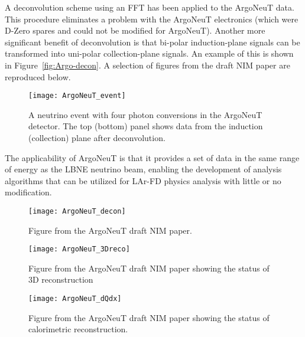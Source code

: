 A deconvolution scheme using an FFT has been applied to the ArgoNeuT data. This procedure eliminates a problem with the ArgoNeuT electronics (which were D-Zero spares and could not be modified for ArgoNeuT). Another more significant benefit of deconvolution is that bi-polar induction-plane signals can be transformed into uni-polar collection-plane signals. An example of this is shown in Figure~\ref{fig:Argo-decon}. A selection of figures from the draft NIM paper are reproduced below.


\begin{figure}
\centering 
{\texttt{[image: ArgoNeuT\_event]}}
\caption[ArgoNeuT neutrino event with four photon conversions]{A neutrino event with four photon conversions in the ArgoNeuT detector. The top (bottom) panel shows data from the induction (collection) plane after deconvolution. }
\label{2pi0}
\end{figure}


The applicability of ArgoNeuT is that it provides a set of data in the same range of energy as the LBNE neutrino beam, enabling the development of analysis algorithms that can be utilized for LAr-FD physics analysis with little or no modification.


\begin{figure}
\centering 
{\texttt{[image: ArgoNeuT\_decon]}}
\caption[Data from ArgoNeuT]{Figure from the ArgoNeuT draft NIM paper. } %
\label{Argo-decon}
\end{figure}

\begin{figure}
\centering 
{\texttt{[image: ArgoNeuT\_3Dreco]}}
\caption[ArgoNeuT: status of 3D reconstruction]{Figure from the ArgoNeuT draft NIM paper showing the status of 3D reconstruction} %
\label{ArgoNeuT_3Dreco}
\end{figure}

\begin{figure}
\centering 
\texttt{[image: ArgoNeuT\_dQdx]}
\caption[ArgoNeuT: status of calorimetric reconstruction]{Figure from the ArgoNeuT draft NIM paper showing the status of calorimetric reconstruction. } %
\label{ArgoNeuT-calorimetry}
\end{figure}

